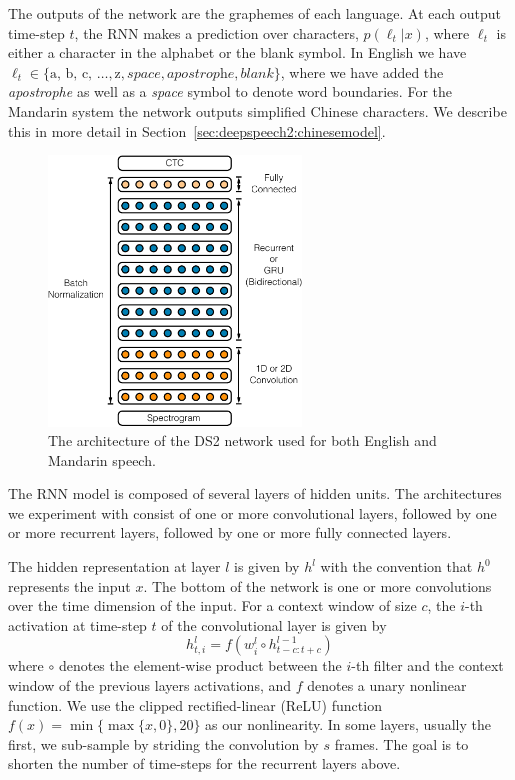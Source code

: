 The outputs of the network are the graphemes of each language. At each output
time-step $t$, the RNN makes a prediction over characters, $p(\ell_t | x)$,
where $\ell_t$ is either a character in the alphabet or the blank symbol. In
English we have $\ell_t \in \{\textrm{a, b, c, }\ldots, \textrm{z},
\textit{space}, \textit{apostrophe}, \textit{blank}\}$, where we have added the
\textit{apostrophe} as well as a \textit{space} symbol to denote word
boundaries. For the Mandarin system the network outputs simplified Chinese
characters.  We describe this in more detail in
Section~\ref{sec:deepspeech2:chinesemodel}.

\begin{figure}
    \centering
    \includegraphics[width=0.6\textwidth]{deepspeech2/figures/ds2_architecture.pdf}
    \caption{The architecture of the DS2 network used for both English and
             Mandarin speech.}
    \label{fig:deepspeech2:ds2_network}
\end{figure}

The RNN model is composed of several layers of hidden units. The architectures
we experiment with consist of one or more convolutional layers, followed by one
or more recurrent layers, followed by one or more fully connected layers.

The hidden representation at layer $l$ is given by $h^l$ with the convention
that $h^0$ represents the input $x$. The bottom of the network is one or more
convolutions over the time dimension of the input. For a context window of size
$c$, the $i$-th activation at time-step $t$ of the convolutional layer is given
by
\begin{equation*}
h_{t,i}^l = f( w_i^l \circ h^{l-1}_{t-c:t+c} )
\end{equation*}
where $\circ$ denotes the element-wise product between the $i$-th filter and
the context window of the previous layers activations, and $f$ denotes a unary
nonlinear function. We use the clipped rectified-linear (ReLU) function $f(x) =
\min\{\max\{x, 0\},20\}$ as our nonlinearity. In some layers, usually the
first, we sub-sample by striding the convolution by $s$ frames. The goal is to
shorten the number of time-steps for the recurrent layers above.

